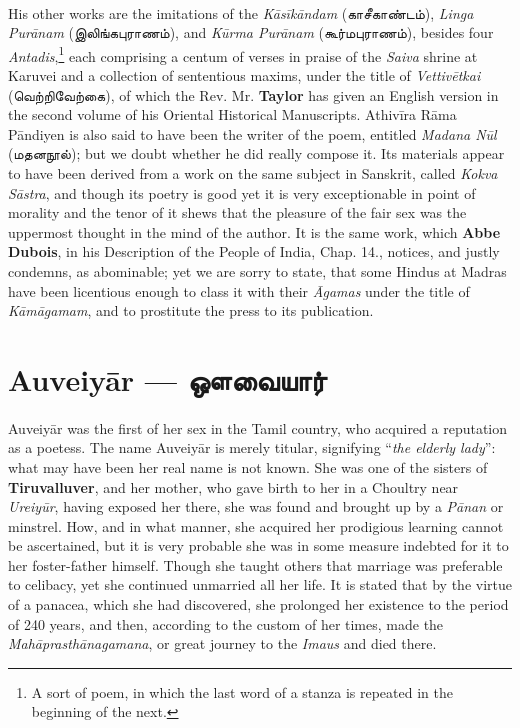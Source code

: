 \documentclass{article}
\newcommand{\TamilText}[1]{\texttamil{#1}}
\newcommand{\TamilBold}[1]{\texttamil{\textbf{#1}}}
\newcommand{\tam}[1]{\TamilText{#1}}
\newcommand{\tambold}[1]{\TamilBold{#1}}
\begin{document}
\paragraph{}
His other works are the imitations of the \emph{K\={a}s\={i}k\={a}ndam} (\tam{காசீகாண்டம்}), \emph{Linga Pur\={a}nam} (\tam{இலிங்கபுராணம்}), and \emph{K\={u}rma Pur\={a}nam} (\tam{கூர்மபுராணம்}), besides four \emph{Antadis},\footnote{A sort of poem, in which the last word of a stanza is repeated in the beginning of the next.} each comprising a centum of verses in praise of the \emph{Saiva} shrine at Karuvei and a collection of sententious maxims, under the title of \emph{Vettiv\={e}tkai} (\tam{வெற்றிவேற்கை}), of which the Rev. Mr. \textbf{Taylor} has given an English version in the second volume of his Oriental Historical Manuscripts. Athiv\={i}ra R\={a}ma P\={a}ndiyen is also said to have been the writer of the poem, entitled \emph{Madana N\={u}l} (\tam{மதனநூல்}); but we doubt whether he did really compose it. Its materials appear to have been derived from a work on the same subject in Sanskrit, called \emph{Kokva S\={a}stra}, and though its poetry is good yet it is very exceptionable in point of morality and the tenor of it shews that the pleasure of the fair sex was the uppermost thought in the mind of the author. It is the same work, which \textbf{Abbe Dubois}, in his Description of the People of India, Chap. 14., notices, and justly condemns, as abominable; yet we are sorry to state, that some Hindus at Madras have been licentious enough to class it with their \emph{\={A}gamas} under the title of \emph{K\={a}m\={a}gamam}, and to prostitute the press to its publication.

\section{Auveiy\={a}r --- \tambold{ஔவையார்}}
\paragraph{}
Auveiy\={a}r was the first of her sex in the Tamil country, who acquired a reputation as a poetess. The name Auveiy\={a}r is merely titular, signifying ``\emph{the elderly lady}'': what may have been her real name is not known. She was one of the sisters of \textbf{Tiruvalluver}, and her mother, who gave birth to her in a Choultry near \emph{Ureiy\={u}r}, having exposed her there, she was found and brought up by a \emph{P\={a}nan} or minstrel. How, and in what manner, she acquired her prodigious learning cannot be ascertained, but it is very probable she was in some measure indebted for it to her foster-father himself. Though she taught others that marriage was preferable to celibacy, yet she continued unmarried all her life. It is stated that by the virtue of a panacea, which she had discovered, she prolonged her existence to the period of 240 years, and then, according to the custom of her times, made the \emph{Mah\={a}prasth\={a}nagamana}, or great journey to the \emph{Imaus} and died there.
\end{document}
